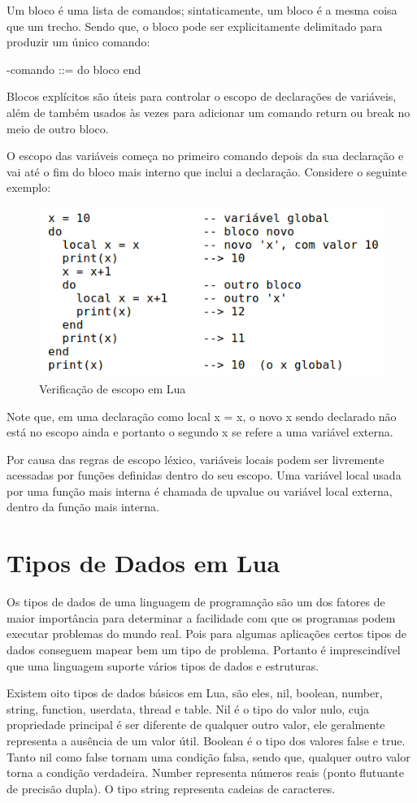 \documentclass[
12pt, %
openright, %
oneside, %
a4paper, %
english, %
brazil, %
]{abntex2}
\begin{document}
Um bloco é uma lista de comandos; sintaticamente, um bloco é a mesma coisa que um trecho. Sendo que, o bloco pode ser explicitamente delimitado para produzir um único comando:

-comando ::= do bloco end

Blocos explícitos são úteis para controlar o escopo de declarações de variáveis, além de também usados às vezes para adicionar um comando return ou break no meio de outro bloco.

O escopo das variáveis começa no primeiro comando depois da sua declaração e vai até o fim do bloco mais interno que inclui a declaração. Considere o seguinte exemplo:

\begin{figure}[H]
\centering
\includegraphics[width=0.5\linewidth]{imagens/imagem3.png}
\caption{Verificação de escopo em Lua \cite{Lua_Org}}
\end{figure}

Note que, em uma declaração como local x = x, o novo x sendo declarado não está no escopo ainda e portanto o segundo x se refere a uma variável externa.

Por causa das regras de escopo léxico, variáveis locais podem ser livremente acessadas por funções definidas dentro do seu escopo. Uma variável local usada por uma função mais interna é chamada de upvalue ou variável local externa, dentro da função mais interna.

\chapter{Tipos de Dados em Lua}
Os tipos de dados de uma linguagem de programação são um dos fatores de maior importância para determinar a facilidade com que os programas podem executar problemas do mundo real. Pois para algumas aplicações certos tipos de dados conseguem mapear bem um tipo de problema. Portanto é imprescindível que uma linguagem suporte vários tipos de dados e estruturas.

Existem oito tipos de dados básicos em Lua, são eles, nil, boolean, number, string, function, userdata, thread e table. Nil é o tipo do valor nulo, cuja propriedade principal é ser diferente de qualquer outro valor, ele geralmente representa a ausência de um valor útil. Boolean é o tipo dos valores false e true. Tanto nil como false tornam uma condição falsa, sendo que, qualquer outro valor torna a condição verdadeira. Number representa números reais (ponto flutuante de precisão dupla). O tipo string representa cadeias de caracteres.
\end{document}
